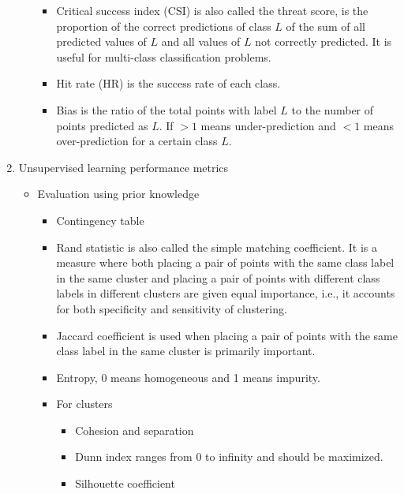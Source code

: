 \documentclass[14pt]{article}
\begin{document}
\begin{enumerate}
\begin{itemize}
\begin{itemize}
     \item Critical success index (CSI) is also called the threat score, is the proportion of the correct predictions of class $L$ of the sum of all predicted values of $L$ and all values of $L$ not correctly predicted. It is useful for multi-class classification problems.
     \item Hit rate (HR) is the success rate of each class.
     \item Bias is the ratio of the total points with label $L$ to the number of points predicted as $L$. If $> 1$ means under-prediction and $<1$ means over-prediction for a certain class $L$.
    \end{itemize}
  \end{itemize}
 
 \item Unsupervised learning performance metrics
  \begin{itemize}
   \item Evaluation using prior knowledge
    \begin{itemize}
     \item Contingency table
     \item Rand statistic is also called the simple matching coefficient. It is a measure where both placing a pair of points with the same class label in the same cluster and placing a pair of points with different class labels in different clusters are given equal importance, i.e., it accounts for both specificity and sensitivity of clustering.
     \item Jaccard coefficient is used when placing a pair of points with the same class label in the same cluster is primarily important.
     \item Entropy, 0 means homogeneous and 1 means impurity.
     \item For clusters
      \begin{itemize}
       \item Cohesion and separation
       \item Dunn index ranges from 0 to infinity and should be maximized.
       \item Silhouette coefficient
      \end{itemize}
    \end{itemize}    
  \end{itemize}
\end{enumerate}
\end{document}
